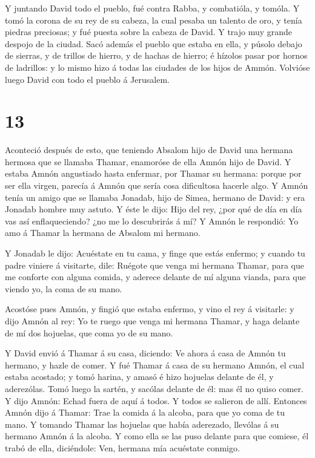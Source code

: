  Y juntando David todo el pueblo, fué contra Rabba, y
combatióla, y tomóla.  Y tomó la corona de su rey de su
cabeza, la cual pesaba un talento de oro, y tenía piedras preciosas; y
fué puesta sobre la cabeza de David. Y trajo muy grande despojo de la
ciudad.  Sacó además el pueblo que estaba en ella, y púsolo
debajo de sierras, y de trillos de hierro, y de hachas de hierro; é
hízolos pasar por hornos de ladrillos: y lo mismo hizo á todas las
ciudades de los hijos de Ammón. Volvióse luego David con todo el pueblo
á Jerusalem.

\hypertarget{section-12}{%
\section{13}\label{section-12}}

 Aconteció después de esto, que teniendo Absalom hijo de
David una hermana hermosa que se llamaba Thamar, enamoróse de ella Amnón
hijo de David.  Y estaba Amnón angustiado hasta enfermar,
por Thamar su hermana: porque por ser ella virgen, parecía á Amnón que
sería cosa dificultosa hacerle algo.  Y Amnón tenía un amigo
que se llamaba Jonadab, hijo de Simea, hermano de David: y era Jonadab
hombre muy astuto.  Y éste le dijo: Hijo del rey, ¿por qué
de día en día vas así enflaqueciendo? ¿no me lo descubrirás á mí? Y
Amnón le respondió: Yo amo á Thamar la hermana de Absalom mi hermano.

 Y Jonadab le dijo: Acuéstate en tu cama, y finge que estás
enfermo; y cuando tu padre viniere á visitarte, dile: Ruégote que venga
mi hermana Thamar, para que me conforte con alguna comida, y aderece
delante de mí alguna vianda, para que viendo yo, la coma de su mano.

 Acostóse pues Amnón, y fingió que estaba enfermo, y vino el
rey á visitarle: y dijo Amnón al rey: Yo te ruego que venga mi hermana
Thamar, y haga delante de mí dos hojuelas, que coma yo de su mano.

 Y David envió á Thamar á su casa, diciendo: Ve ahora á casa
de Amnón tu hermano, y hazle de comer.  Y fué Thamar á casa
de su hermano Amnón, el cual estaba acostado; y tomó harina, y amasó é
hizo hojuelas delante de él, y aderezólas.  Tomó luego la
sartén, y sacólas delante de él: mas él no quiso comer. Y dijo Amnón:
Echad fuera de aquí á todos. Y todos se salieron de allí. 
Entonces Amnón dijo á Thamar: Trae la comida á la alcoba, para que yo
coma de tu mano. Y tomando Thamar las hojuelas que había aderezado,
llevólas á su hermano Amnón á la alcoba.  Y como ella se
las puso delante para que comiese, él trabó de ella, diciéndole: Ven,
hermana mía acuéstate conmigo.

